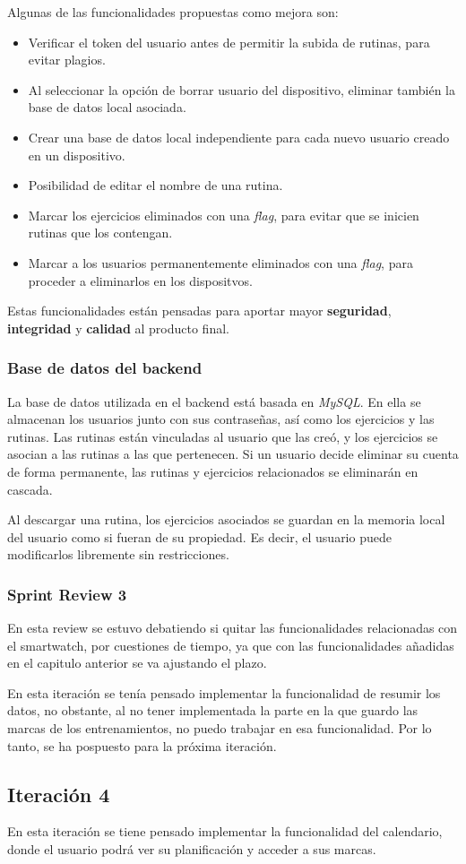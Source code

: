 Algunas de las funcionalidades propuestas como mejora son:

\begin{itemize}
  \item Verificar el token del usuario antes de permitir la subida de rutinas, para evitar plagios.
  \item Al seleccionar la opci\'on de borrar usuario del dispositivo, eliminar tambi\'en la base de datos local asociada.
  \item Crear una base de datos local independiente para cada nuevo usuario creado en un dispositivo.
  \item Posibilidad de editar el nombre de una rutina.
  \item Marcar los ejercicios eliminados con una \textit{flag}, para evitar que se inicien rutinas que los contengan.
  \item Marcar a los usuarios permanentemente eliminados con una \textit{flag}, para proceder a eliminarlos en los dispositvos.
\end{itemize}

Estas funcionalidades est\'an pensadas para aportar mayor \textbf{seguridad}, \textbf{integridad} y \textbf{calidad} al producto final.

\subsubsection{Base de datos del backend}
La base de datos utilizada en el backend está basada en \textit{MySQL}. En ella se almacenan los usuarios junto con sus contraseñas, así como los ejercicios y las rutinas. Las rutinas están vinculadas al usuario que las creó, y los ejercicios se asocian a las rutinas a las que pertenecen. Si un usuario decide eliminar su cuenta de forma permanente, las rutinas y ejercicios relacionados se eliminarán en cascada.

Al descargar una rutina, los ejercicios asociados se guardan en la memoria local del usuario como si fueran de su propiedad. Es decir, el usuario puede modificarlos libremente sin restricciones.

\subsubsection{Sprint Review 3}

En esta review se estuvo debatiendo si quitar las funcionalidades relacionadas con el smartwatch, por cuestiones de tiempo, ya que con las funcionalidades añadidas en el capitulo anterior se va ajustando el plazo.

En esta iteración se tenía pensado implementar la funcionalidad de resumir los datos, no obstante, al no tener implementada la parte en la que guardo las marcas de los entrenamientos, no puedo trabajar en esa funcionalidad. Por lo tanto, se ha pospuesto para la próxima iteración.

\subsection{Iteraci\'on 4}

En esta iteración se tiene pensado implementar la funcionalidad del calendario, donde el usuario podrá ver su planificación y acceder a sus marcas.